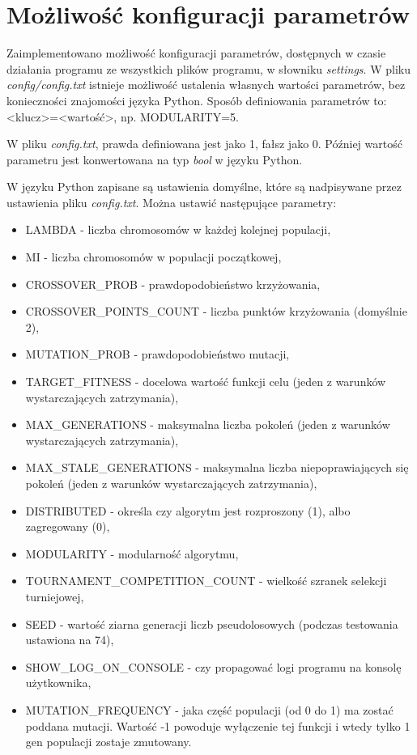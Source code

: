 \section{Możliwość konfiguracji parametrów}

Zaimplementowano możliwość konfiguracji parametrów, dostępnych w czasie działania programu ze wszystkich plików programu, w słowniku \textit{settings}. W pliku \textit{config/config.txt} istnieje możliwość ustalenia własnych wartości parametrów, bez konieczności znajomości języka Python. Sposób definiowania parametrów to: <klucz>=<wartość>, np. MODULARITY=5.

W pliku \textit{config.txt}, prawda definiowana jest jako 1, fałsz jako 0. Później wartość parametru jest konwertowana na typ \textit{bool} w języku Python.

W języku Python zapisane są ustawienia domyślne, które są nadpisywane przez ustawienia pliku \textit{config.txt}. Można ustawić następujące parametry:
\begin{itemize}
    \item LAMBDA - liczba chromosomów w każdej kolejnej populacji,
    \item MI - liczba chromosomów w populacji początkowej,
    \item CROSSOVER\_PROB - prawdopodobieństwo krzyżowania,
    \item CROSSOVER\_POINTS\_COUNT - liczba punktów krzyżowania (domyślnie 2),
    \item MUTATION\_PROB - prawdopodobieństwo mutacji,
    \item TARGET\_FITNESS - docelowa wartość funkcji celu (jeden z warunków wystarczających zatrzymania),
    \item MAX\_GENERATIONS - maksymalna liczba pokoleń (jeden z warunków wystarczających zatrzymania),
    \item MAX\_STALE\_GENERATIONS - maksymalna liczba niepoprawiających się pokoleń (jeden z warunków wystarczających zatrzymania),
    \item DISTRIBUTED - określa czy algorytm jest rozproszony (1), albo zagregowany (0),
    \item MODULARITY - modularność algorytmu,
    \item TOURNAMENT\_COMPETITION\_COUNT - wielkość szranek selekcji turniejowej,
    \item SEED - wartość ziarna generacji liczb pseudolosowych (podczas testowania ustawiona na 74),
    \item SHOW\_LOG\_ON\_CONSOLE - czy propagować logi programu na konsolę użytkownika,
    \item MUTATION\_FREQUENCY - jaka część populacji (od 0 do 1) ma zostać poddana mutacji. Wartość -1 powoduje wyłączenie tej funkcji i wtedy tylko 1 gen populacji zostaje zmutowany.
\end{itemize}


